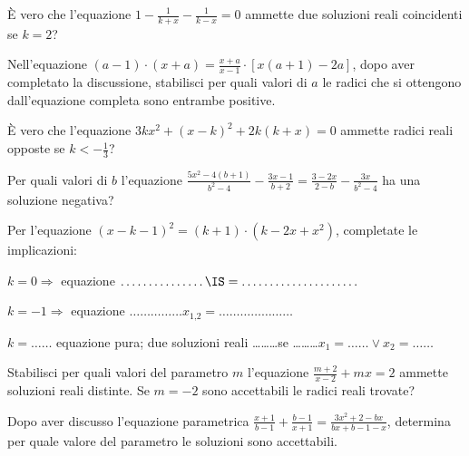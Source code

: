 \begin{esercizio}
 \label{ese:3.69}
È vero che l'equazione $1-\frac{1}{k + x}-\frac{1}{k-x}=0$ ammette due soluzioni reali coincidenti se $k = 2$?
\end{esercizio}

\begin{esercizio}
 \label{ese:3.70}
Nell'equazione $(a-1) \cdot (x + a)=\frac{x + a}{x-1} \cdot [ x (a +1)-2 a ]$, dopo aver completato la discussione, stabilisci per quali valori di $a$ le
radici che si ottengono dall'equazione completa sono entrambe positive.
\end{esercizio}

\begin{esercizio}
 \label{ese:3.71}
È vero che l'equazione $3 k x^{2} + (x-k)^{2} + 2 k (k + x)=0$ ammette radici reali opposte se $k <-\frac{1}{3}$?
\end{esercizio}

\begin{esercizio}
 \label{ese:3.72}
Per quali valori di $b$ l'equazione $\frac{5 x^{2}-4 (b + 1)}{b^{2}-4}-\frac{3 x-1}{b + 2 }=\frac{3-2 x}{2-b}-\frac{3 x}{b^{2}-4}$ ha una soluzione negativa?
\end{esercizio}

\begin{esercizio}
 \label{ese:3.73}
Per l'equazione $(x-k-1)^{2}=(k + 1) \cdot (k-2 x + x^{2})$, completate le implicazioni:

$k = 0 \Rightarrow$ equazione $\ldots\ldots\ldots\ldots \ldots \IS = \ldots \ldots \ldots \ldots \ldots \ldots \ldots$

$k =-1 \Rightarrow$ equazione $\ldots\ldots\ldots\ldots \ldots x_{1\text{,}2} = \ldots \ldots \ldots \ldots \ldots \ldots \ldots$

$k =\ldots \ldots$ equazione pura; due soluzioni reali \ldots\ldots\ldots se \ldots\ldots \ldots $x_{1} = \ldots \ldots \vee x_{2} = \ldots \ldots$

\end{esercizio}

\begin{esercizio}
 \label{ese:3.74}
Stabilisci per quali valori del parametro $m$ l'equazione $\frac{m + 2}{x-2} + m x=2$ ammette soluzioni reali distinte. Se $m =-2$ sono accettabili le radici reali trovate?
\end{esercizio}

\begin{esercizio}
 \label{ese:3.75}
Dopo aver discusso l'equazione parametrica $\frac{x + 1}{b-1} + \frac{b-1}{x + 1}=\frac{3 x^{2} +2-b x}{b x + b-1-x}$, determina per quale valore del parametro le soluzioni sono accettabili.
\end{esercizio}

